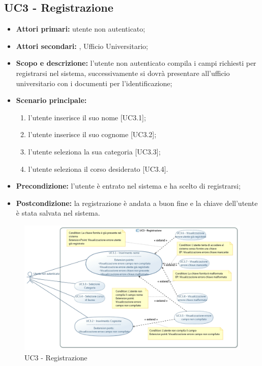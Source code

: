 \documentclass[AnalisiDeiRequisiti.tex]{subfiles}
\begin{document}
\subsection{UC3 - Registrazione}
\begin{itemize}
	\item \textbf{Attori primari:} utente non autenticato;\\
	\item \textbf{Attori secondari:} , Ufficio Universitario;
	\item \textbf{Scopo e descrizione:} l'utente non autenticato compila i campi richiesti per registrarsi nel sistema, successivamente si dovrà presentare all'ufficio universitario con i documenti per l'identificazione;\\
	\item \textbf{Scenario principale:}
	\begin{enumerate}
		\item l'utente inserisce il suo nome [UC3.1];
		\item l'utente inserisce il suo cognome [UC3.2];
		\item l'utente seleziona la sua categoria [UC3.3];
		\item l'utente seleziona il corso desiderato [UC3.4].
	\end{enumerate}
	\item \textbf{Precondizione:} l'utente è entrato nel sistema e ha scelto di registrarsi;\\
	\item \textbf{Postcondizione:} la registrazione è andata a buon fine e la chiave dell'utente è stata salvata nel sistema.\\
\end{itemize}

\begin{figure}[H]
	\centering
	\includegraphics[width=1.0\linewidth]{UC3.jpg}
	\caption{UC3 - Registrazione}
	\label{fig:UC3 - Registrazione}
\end{figure}
\end{document}
